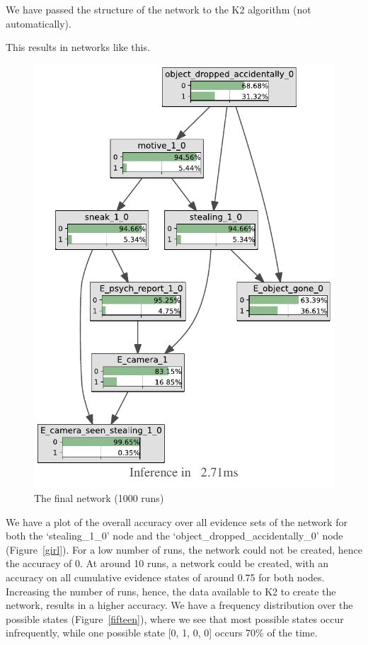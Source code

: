 \documentclass[12pt]{article}
\begin{document}
We have passed the structure of the network to the K2 algorithm (not automatically). 

 This results in networks like this.
 
\begin{figure}[htbp]
\begin{center}
\includegraphics[width=\linewidth]{GroteMarktPrivate/bnImage/BNIMAGEGroteMarktPrivate1000.pdf}
\caption{The final network (1000 runs)}
\label{bullet}
\end{center}
\end{figure}



We have a plot of the overall accuracy over all evidence sets of the network for both the `stealing\_1\_0' node and the `object\_dropped\_accidentally\_0' node (Figure~\ref{girl}). For a low number of runs, the network could not be created, hence the accuracy of 0. At around 10 runs, a network could be created, with an accuracy on all cumulative evidence states of around 0.75 for both nodes. Increasing the number of runs, hence, the data available to K2 to create the network, results in a higher accuracy. We have a frequency distribution over the possible states (Figure~\ref{fifteen}), where we see that most possible states occur infrequently, while one possible state [0, 1, 0, 0] occurs 70\% of the time. 
\end{document}
